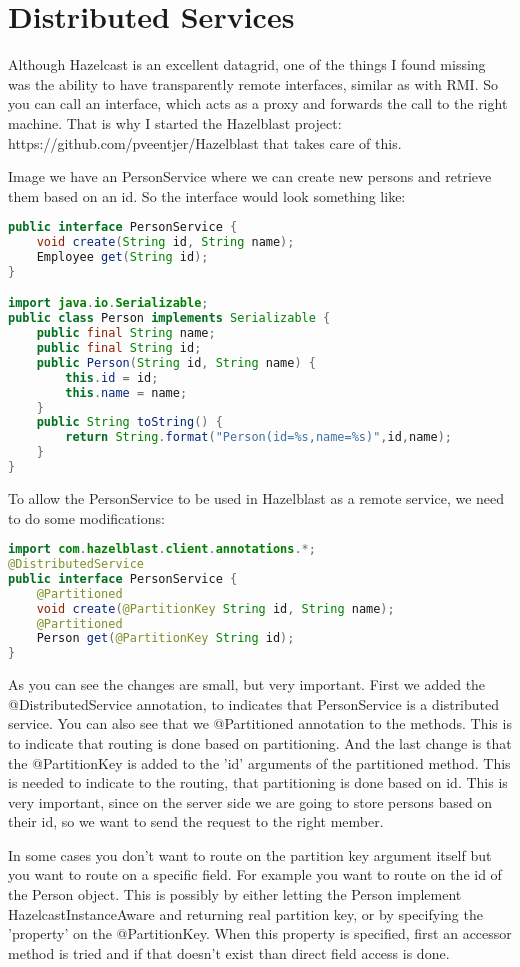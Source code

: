 \chapter{Distributed Services}
Although Hazelcast is an excellent datagrid, one of the things I found missing was the ability to have transparently remote interfaces, similar as with RMI. So you can call an interface, which acts as a proxy and forwards the call to the right machine. That is why I started the Hazelblast project: https://github.com/pveentjer/Hazelblast that takes care of this.

Image we have an PersonService where we can create new persons and retrieve them based on an id. So the interface would look something like:
\begin{lstlisting}[language=java]
public interface PersonService {
    void create(String id, String name);
    Employee get(String id);
}

import java.io.Serializable;
public class Person implements Serializable {
    public final String name;
    public final String id;
    public Person(String id, String name) {
        this.id = id;
        this.name = name;
    }
    public String toString() {
        return String.format("Person(id=%s,name=%s)",id,name);
    }
}
\end{lstlisting}

To allow the PersonService to be used in Hazelblast as a remote service, we need to do some modifications:
\begin{lstlisting}[language=java]
import com.hazelblast.client.annotations.*;
@DistributedService
public interface PersonService {
    @Partitioned
    void create(@PartitionKey String id, String name);
    @Partitioned
    Person get(@PartitionKey String id);
}
\end{lstlisting}
As you can see the changes are small, but very important. First we added the @DistributedService annotation, to indicates that PersonService is a distributed service. You can also see that we @Partitioned annotation to the methods. This is to indicate that routing is done based on partitioning. And the last change is that the @PartitionKey is added to the 'id' arguments of the partitioned method. This is needed to indicate to the routing, that partitioning is done based on id. This is very important, since on the server side we are going to store persons based on their id, so we want to send the request to the right member. 

In some cases you don't want to route on the partition key argument itself but you want to route on a specific field. For example you want to route on the id of the Person object. This is possibly by either letting the Person implement HazelcastInstanceAware and returning real partition key, or by specifying the 'property' on the @PartitionKey. When this property is specified, first an accessor method is tried and if that doesn't exist than direct field access is done.

